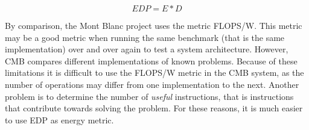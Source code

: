 \begin{equation}
  \label{eq:edp}
  EDP = E * D
\end{equation}

By comparison, the Mont Blanc project uses the metric FLOPS/W. This metric may be a good metric when running the same benchmark (that is the same implementation) over and over again to test a system architecture. However, CMB compares different implementations of known problems. Because of these limitations it is difficult to use the FLOPS/W metric in the CMB system, as the number of operations may differ from one implementation to the next. Another problem is to determine the number of \textit{useful} instructions, that is instructions that contribute towards solving the problem. For these reasons, it is much easier to use EDP as energy metric.

